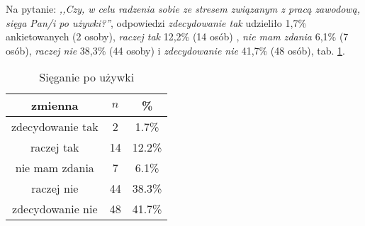 Na pytanie: \textit{,,Czy, w celu radzenia sobie ze stresem związanym z pracą zawodową, sięga Pan/i po używki?''}, odpowiedzi \textit{zdecydowanie tak} udzieliło 1,7\% ankietowanych (2 osoby), \textit{raczej tak} 12,2\% (14 osób) , \textit{nie mam zdania} 6,1\% (7 osób), \textit{raczej nie} 38,3\% (44 osoby) i \textit{zdecydowanie nie} 41,7\% (48 osób), tab. \ref{tab:Q13}.

\begin{table}[H]
\caption{Sięganie po używki}
\centering
\begin{tabular}{ | c | c | c |}
\hline
zmienna & $n$ & \% \\
\hline
zdecydowanie tak  &  2  & 1.7\% \\
\hline
raczej tak  &  14  & 12.2\% \\
\hline
nie mam zdania  &  7  & 6.1\% \\
\hline
raczej nie  &  44  & 38.3\% \\
\hline
zdecydowanie nie  &  48  & 41.7\% \\
\hline
\end{tabular}
\label{tab:Q13}
\end{table}
